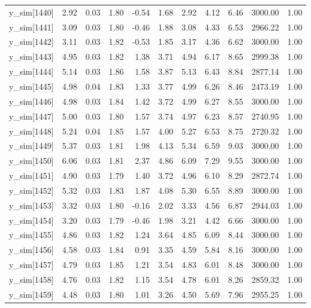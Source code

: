 \begin{table}[ht]
\begin{tabular}{rrrrrrrrrrr}
  y\_sim[1440] & 2.92 & 0.03 & 1.80 & -0.54 & 1.68 & 2.92 & 4.12 & 6.46 & 3000.00 & 1.00 \\ 
  y\_sim[1441] & 3.09 & 0.03 & 1.80 & -0.46 & 1.88 & 3.08 & 4.33 & 6.53 & 2966.22 & 1.00 \\ 
  y\_sim[1442] & 3.11 & 0.03 & 1.82 & -0.53 & 1.85 & 3.17 & 4.36 & 6.62 & 3000.00 & 1.00 \\ 
  y\_sim[1443] & 4.95 & 0.03 & 1.82 & 1.38 & 3.71 & 4.94 & 6.17 & 8.65 & 2999.38 & 1.00 \\ 
  y\_sim[1444] & 5.14 & 0.03 & 1.86 & 1.58 & 3.87 & 5.13 & 6.43 & 8.84 & 2877.14 & 1.00 \\ 
  y\_sim[1445] & 4.98 & 0.04 & 1.83 & 1.33 & 3.77 & 4.99 & 6.26 & 8.46 & 2473.19 & 1.00 \\ 
  y\_sim[1446] & 4.98 & 0.03 & 1.84 & 1.42 & 3.72 & 4.99 & 6.27 & 8.55 & 3000.00 & 1.00 \\ 
  y\_sim[1447] & 5.00 & 0.03 & 1.80 & 1.57 & 3.74 & 4.97 & 6.23 & 8.57 & 2740.95 & 1.00 \\ 
  y\_sim[1448] & 5.24 & 0.04 & 1.85 & 1.57 & 4.00 & 5.27 & 6.53 & 8.75 & 2720.32 & 1.00 \\ 
  y\_sim[1449] & 5.37 & 0.03 & 1.81 & 1.98 & 4.13 & 5.34 & 6.59 & 9.03 & 3000.00 & 1.00 \\ 
  y\_sim[1450] & 6.06 & 0.03 & 1.81 & 2.37 & 4.86 & 6.09 & 7.29 & 9.55 & 3000.00 & 1.00 \\ 
  y\_sim[1451] & 4.90 & 0.03 & 1.79 & 1.40 & 3.72 & 4.96 & 6.10 & 8.29 & 2872.74 & 1.00 \\ 
  y\_sim[1452] & 5.32 & 0.03 & 1.83 & 1.87 & 4.08 & 5.30 & 6.55 & 8.89 & 3000.00 & 1.00 \\ 
  y\_sim[1453] & 3.32 & 0.03 & 1.80 & -0.16 & 2.02 & 3.33 & 4.56 & 6.87 & 2944.03 & 1.00 \\ 
  y\_sim[1454] & 3.20 & 0.03 & 1.79 & -0.46 & 1.98 & 3.21 & 4.42 & 6.66 & 3000.00 & 1.00 \\ 
  y\_sim[1455] & 4.86 & 0.03 & 1.82 & 1.24 & 3.64 & 4.85 & 6.09 & 8.44 & 3000.00 & 1.00 \\ 
  y\_sim[1456] & 4.58 & 0.03 & 1.84 & 0.91 & 3.35 & 4.59 & 5.84 & 8.16 & 3000.00 & 1.00 \\ 
  y\_sim[1457] & 4.79 & 0.03 & 1.85 & 1.21 & 3.54 & 4.83 & 6.01 & 8.48 & 3000.00 & 1.00 \\ 
  y\_sim[1458] & 4.76 & 0.03 & 1.82 & 1.15 & 3.54 & 4.78 & 6.01 & 8.26 & 2859.32 & 1.00 \\ 
  y\_sim[1459] & 4.48 & 0.03 & 1.80 & 1.01 & 3.26 & 4.50 & 5.69 & 7.96 & 2955.25 & 1.00 \\ 

\end{tabular}
\end{table}
